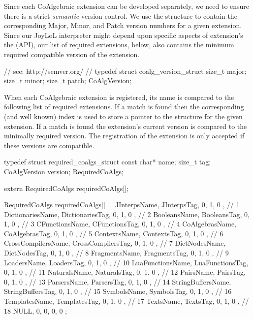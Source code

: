 Since each CoAlgebraic extension can be developed separately, we need to 
ensure there is a strict \emph{semantic} version control. We use the 
 structure to contain the corresponding Major, Minor, 
and Patch version numbers for a given extension. Since our JoyLoL 
interpreter might depend upon specific aspects of extension's the 
 (API), our list of required 
extensions, below, also contains the minimum required compatible version 
of the extension. 

\startCHeader
// see: http://semver.org/
//
typedef struct coalg_version_struct {
  size_t major;
  size_t minor;
  size_t patch;
} CoAlgVersion;
\stopCHeader

When each CoAlgebraic extension is registered, its name is compared to the 
following list of required extensions. If a match is found then the 
corresponding (and well known) index is used to store a pointer to the 
 structure for the given extension. If a match is found 
the extension's current version is compared to the minimally required 
version. The registration of the extension is only accepted if these 
versions are compatible. 

\startCHeader
typedef struct required_coalgs_struct {
  const char*  name;
  size_t       tag;
  CoAlgVersion version;
} RequiredCoAlgs;

extern RequiredCoAlgs requiredCoAlgs[];
\stopCHeader
{}

\startCCode
RequiredCoAlgs requiredCoAlgs[] = {
  { JInterpsName,       JInterpsTag,       {0, 1, 0 }}, //  1
  { DictionariesName,   DictionariesTag,   {0, 1, 0 }}, //  2
  { BooleansName,       BooleansTag,       {0, 1, 0 }}, //  3
  { CFunctionsName,     CFunctionsTag,     {0, 1, 0 }}, //  4
  { CoAlgebrasName,     CoAlgebrasTag,     {0, 1, 0 }}, //  5
  { ContextsName,       ContextsTag,       {0, 1, 0 }}, //  6
  { CrossCompilersName, CrossCompilersTag, {0, 1, 0 }}, //  7
  { DictNodesName,      DictNodesTag,      {0, 1, 0 }}, //  8
  { FragmentsName,      FragmentsTag,      {0, 1, 0 }}, //  9
  { LoadersName,        LoadersTag,        {0, 1, 0 }}, // 10
  { LuaFunctionsName,   LuaFunctionsTag,   {0, 1, 0 }}, // 11
  { NaturalsName,       NaturalsTag,       {0, 1, 0 }}, // 12
  { PairsName,          PairsTag,          {0, 1, 0 }}, // 13
  { ParsersName,        ParsersTag,        {0, 1, 0 }}, // 14
  { StringBuffersName,  StringBuffersTag,  {0, 1, 0 }}, // 15
  { SymbolsName,        SymbolsTag,        {0, 1, 0 }}, // 16
  { TemplatesName,      TemplatesTag,      {0, 1, 0 }}, // 17
  { TextsName,          TextsTag,          {0, 1, 0 }}, // 18
  { NULL,               0,                 {0, 0, 0 }}
};
\stopCCode

